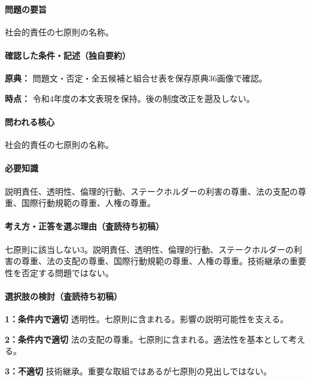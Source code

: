 \paragraph{問題の要旨} 社会的責任の七原則の名称。

\paragraph{確認した条件・記述（独自要約）}\mbox{}\par

\noindent\textbf{原典：} 問題文・否定・全五候補と組合せ表を保存原典36画像で確認。\par

\noindent\textbf{時点：} 令和4年度の本文表現を保持。後の制度改正を遡及しない。\par

\paragraph{問われる核心} 社会的責任の七原則の名称。

\paragraph{必要知識} 説明責任、透明性、倫理的行動、ステークホルダーの利害の尊重、法の支配の尊重、国際行動規範の尊重、人権の尊重。

\paragraph{考え方・正答を選ぶ理由（査読待ち初稿）} 七原則に該当しない3。説明責任、透明性、倫理的行動、ステークホルダーの利害の尊重、法の支配の尊重、国際行動規範の尊重、人権の尊重。技術継承の重要性を否定する問題ではない。

\paragraph{選択肢の検討（査読待ち初稿）}\mbox{}\par

\noindent\textbf{1：条件内で適切} 透明性。七原則に含まれる。影響の説明可能性を支える。\par

\noindent\textbf{2：条件内で適切} 法の支配の尊重。七原則に含まれる。適法性を基本として考える。\par

\noindent\textbf{3：不適切} 技術継承。重要な取組ではあるが七原則の見出しではない。\par

